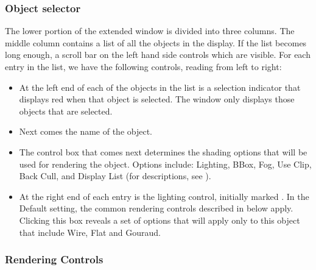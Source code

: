 \subsubsection{Object selector}

The lower portion of the extended \viewer{} window is divided into three
columns. The middle column contains a list of all the objects in the
display.  If the list becomes long enough, a scroll bar on the left
hand side controls which are visible.  For each entry in the list, we have
the following controls, reading from left to right:

\begin{itemize}
  \item At the left end of each of the
        objects in the list is a selection indicator that displays red
        when that object is 
        selected.  The \viewer{} window only displays those objects that
        are selected.
  \item Next comes the name of the object.
  \item The  control box that comes next determines the
        shading options that will be used for rendering the object.
        Options include: Lighting, BBox, Fog, Use Clip, Back Cull, and
        Display List (for descriptions, see
        ).
  \item At the right end of each entry is the lighting control, initially
        marked .  In the Default setting, the common
        rendering controls described in  below apply.  Clicking this box
        reveals a set of options that will apply only to this object that
        include Wire, Flat and Gouraud.
\end{itemize}


\subsubsection{Rendering Controls}
\label{sec:view-rendering} 

